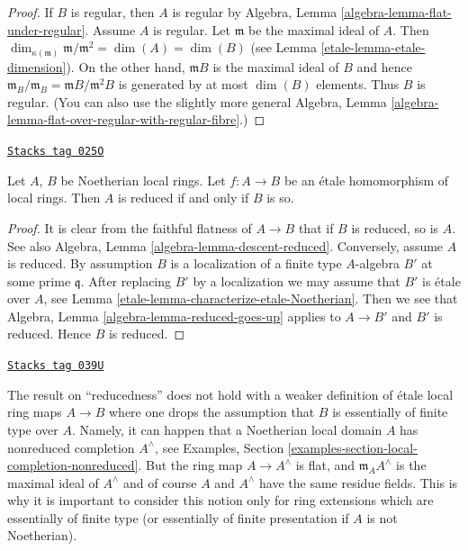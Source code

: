 \begin{proof}

If $B$ is regular, then $A$ is regular by
Algebra, Lemma \ref{algebra-lemma-flat-under-regular}.
Assume $A$ is regular. Let $\mathfrak m$ be the maximal ideal
of $A$. Then $\dim_{\kappa(\mathfrak m)} \mathfrak m/\mathfrak m^2 =
\dim(A) = \dim(B)$ (see Lemma \ref{etale-lemma-etale-dimension}).
On the other hand, $\mathfrak mB$ is the maximal ideal of
$B$ and hence $\mathfrak m_B/\mathfrak m_B = \mathfrak mB/\mathfrak m^2B$
is generated by at most $\dim(B)$ elements. Thus $B$ is regular.
(You can also use the slightly more general
Algebra, Lemma \ref{algebra-lemma-flat-over-regular-with-regular-fibre}.)
\end{proof}


\begin{proposition}
\label{etale-proposition-etale-reduced}
\href{https://stacks.math.columbia.edu/tag/025O}{\texttt{Stacks tag 025O}}

Let $A$, $B$ be Noetherian local rings.
Let $f : A \to B$ be an \'etale homomorphism of local rings.
Then $A$ is reduced if and only if $B$ is so.
\end{proposition}

\begin{proof}

It is clear from the faithful flatness of $A \to B$ that if $B$ is reduced, so
is $A$. See also Algebra, Lemma \ref{algebra-lemma-descent-reduced}.
Conversely, assume $A$ is reduced. By assumption $B$ is a localization
of a finite type $A$-algebra $B'$ at some prime $\mathfrak q$.
After replacing $B'$ by a localization we may assume that $B'$
is \'etale over $A$, see Lemma \ref{etale-lemma-characterize-etale-Noetherian}.
Then we see that Algebra, Lemma \ref{algebra-lemma-reduced-goes-up} applies to
$A \to B'$ and $B'$ is reduced. Hence $B$ is reduced.
\end{proof}

\begin{remark}
\label{etale-remark-technicality-needed}
\href{https://stacks.math.columbia.edu/tag/039U}{\texttt{Stacks tag 039U}}

The result on ``reducedness'' does not hold with a weaker
definition of \'etale local ring maps $A \to B$ where one
drops the assumption that $B$ is essentially of finite type over $A$.
Namely, it can happen that a Noetherian local domain $A$ has nonreduced
completion $A^\wedge$, see
Examples, Section \ref{examples-section-local-completion-nonreduced}.
But the ring map $A \to A^\wedge$ is flat, and $\mathfrak m_AA^\wedge$
is the maximal ideal of $A^\wedge$ and of course $A$ and $A^\wedge$ have
the same residue fields. This is why it is important to consider
this notion only for ring extensions which are essentially of finite type
(or essentially of finite presentation if $A$ is not Noetherian).
\end{remark}

